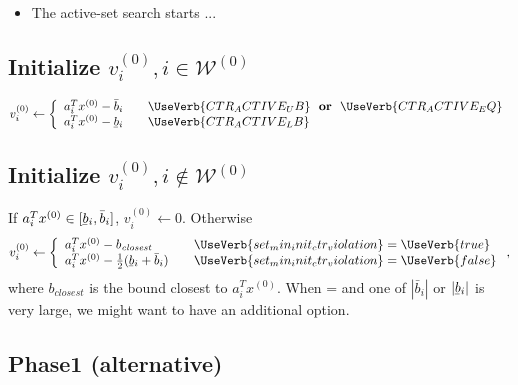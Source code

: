 \documentclass[12pt,a4paper]{article}
\newcommand{\abs}[1]{\left\lvert#1\right\rvert}
\newcommand{\ubar}[1]{\underaccent{\bar}{#1}}
\begin{document}
\begin{itemize}
\item The active-set search starts ...
\end{itemize}

\subsection{Initialize $v_i^{(0)}, i\in\mathcal{W}^{(0)}$}

\begin{align} \label{eq.v0_active}
  v_i^{(0)} \leftarrow \left\{ 
  \begin{array}{l l}
    a_i^Tx^{(0)} - \bar{b}_i & \quad \UseVerb{CTR_ACTIVE_UB} \,\,\,\, \text{\bf or} \,\,\,\, \UseVerb{CTR_ACTIVE_EQ} \\
    a_i^Tx^{(0)} - \ubar{b}_i & \quad \UseVerb{CTR_ACTIVE_LB}
  \end{array} \right.
\end{align}

\subsection{Initialize $v_i^{(0)}, i\not\in\mathcal{W}^{(0)}$} \label{sec.v0_inactive}
%
If $a_i^Tx^{(0)} \in [\ubar{b}_i,\bar{b}_i]$, $v_i^{(0)} \leftarrow 0$. Otherwise
%
\begin{align} \label{eq.v0_inactive}
  v_i^{(0)} \leftarrow \left\{ 
  \begin{array}{l l}
    a^T_ix^{(0)} - b_{\mathit{closest}} & \quad \UseVerb{set_min_init_ctr_violation} = \UseVerb{true} \\
    a^T_ix^{(0)} - \frac{1}{2}(\ubar{b}_i + \bar{b}_i) & \quad \UseVerb{set_min_init_ctr_violation} = \UseVerb{false}
  \end{array} \right.,
\end{align}
%
where $b_{\mathit{closest}}$ is the bound closest to $a^T_ix^{(0)}$. When
 =  and one of $\abs{\bar{b}_i}$ or
$\abs{\ubar{b}_i}$ is very large, we might want to have an additional option. %

\clearpage

\subsection{Phase1 (alternative)} \label{sec.phase1_v0}
\end{document}
